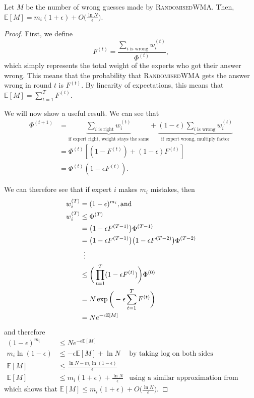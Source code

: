 \documentclass[12pt]{article}
\newcommand{\expected}{\mathbb{E}}
\begin{document}
\begin{theorem}
	Let $M$ be the number of wrong guesses made by \textsc{RandomisedWMA}. Then, $\expected[M] = m_i (1+\epsilon) + O\big(\frac{\ln N}{\epsilon}\big)$.
\end{theorem}
\begin{proof}
	First, we define $$F^{(t)} = \frac{\sum\limits_{i\text{ is wrong} } w_i^{(t)}}{\Phi^{(t)}}, $$ which simply represents the total weight of the experts who got their answer wrong. This means that the probability that \textsc{RandomisedWMA} gets the answer wrong in round $t$ is $F^{(t)}$. By linearity of expectations, this means that $\expected[M] = \sum_{t=1}^{T} F^{(t)}$. 
	
	We will now show a useful result. We can see that
	\begin{align*}
		\Phi^{(t+1)} &= \underbrace{\sum\limits_{i\text{ is right} } w_i^{(t)}}_\text{if expert right, weight stays the same} + \underbrace{(1-\epsilon)\sum\limits_{i\text{ is wrong} } w_i^{(t)}}_\text{if expert wrong, multiply factor} \\
		&= \Phi^{(t)} [ (1-F^{(t)}) + (1-\epsilon)F^{(t)} ]\\
		&= \Phi^{(t)}(1-\epsilon F^{(t)}).
	\end{align*}
	
	We can therefore see that if expert $i$ makes $m_i$ mistakes, then
	\begin{align*}
		w_i^{(T)} &= (1-\epsilon)^{m_i}, \text{and} \\
		w_i^{(T)} &\leq \Phi^{(T)} \\
		&= \big(1 - \epsilon F^{(T-1)}\big) \Phi^{(T-1)} \\
		&= \big(1 - \epsilon F^{(T-1)}\big) \big(1 - \epsilon F^{(T-2)}\big)\Phi^{(T-2)} \\
		&\vdotswithin{\leq} \\
		&\leq \bigg( \prod_{t=1}^{T} (1 - \epsilon F^{(t)}) \bigg) \Phi^{(0)} \\
		&= N\exp \bigg( -\epsilon \sum_{t=1}^{T} F^{(t)} \bigg) \\
		&=N e^{-\epsilon \expected[M]}
	\end{align*}
	and therefore
	\begin{align*}
		(1-\epsilon)^{m_i} &\leq N e^{-\epsilon \expected[M]} \\
		m_i \ln (1-\epsilon) &\leq -\epsilon \expected[M] + \ln N &\text{by taking log on both sides}\\
		\expected[M] &\leq \frac{\ln N - m_i \ln(1-\epsilon)}{\epsilon} \\
		\expected[M] &\leq m_i(1+\epsilon) + \frac{\ln N}{\epsilon} &\text{using a similar approximation from before}
	\end{align*}
	which shows that $\expected[M] \leq m_i(1+\epsilon) + O\big(\frac{\ln N}{\epsilon}\big)$.
\end{proof}
\end{document}
